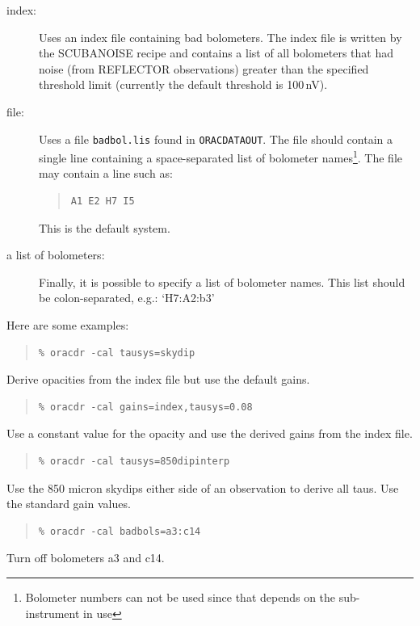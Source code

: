 \documentclass[twoside,11pt]{article}
\renewcommand{\_}{\texttt{\symbol{95}}}
\newcommand{\recipe}[1]{{\small\textsf{#1}}}
\newenvironment{myquote}{\begin{quote}\begin{small}}{\end{small}\end{quote}}
\begin{document}
\begin{itemize}
\begin{description}
\item[index:] Uses an index file containing bad bolometers. The index
file is written by the \recipe{SCUBA\_NOISE} recipe and contains a list
of all bolometers that had noise (from REFLECTOR observations) greater than
the specified threshold limit (currently the default threshold is 100\,nV).
\item[file:] Uses a file \verb|badbol.lis| found
in \texttt{ORAC\_DATA\_OUT}.
The file should contain a single line containing a space-separated list
of bolometer names\footnote{Bolometer numbers can not be used since that
depends on the sub-instrument in use}. The file may contain a line such as:
\begin{myquote}
\begin{verbatim}
A1 E2 H7 I5
\end{verbatim}
\end{myquote}
This is the default system.
\item[a list of bolometers:] Finally, it is possible to specify a list of 
bolometer names. This list should be colon-separated, e.g.: `H7:A2:b3'

\end{description}

\end{itemize}

Here are some examples:

\begin{myquote}
\begin{verbatim}
% oracdr -cal tausys=skydip
\end{verbatim}
\end{myquote}
Derive opacities from the index file but use the default gains.
\begin{myquote}
\begin{verbatim}
% oracdr -cal gains=index,tausys=0.08
\end{verbatim}
\end{myquote}
Use a constant value for the opacity and use the derived gains
from the index file.
\begin{myquote}
\begin{verbatim}
% oracdr -cal tausys=850dipinterp
\end{verbatim}
\end{myquote}
Use the 850 micron skydips either side of an observation 
to derive all taus. Use the standard gain values.
\begin{myquote}
\begin{verbatim}
% oracdr -cal badbols=a3:c14
\end{verbatim}
\end{myquote}
Turn off bolometers a3 and c14.
\end{document}
